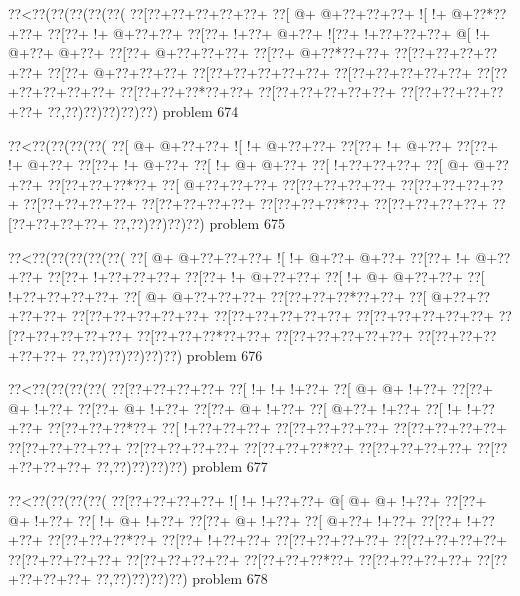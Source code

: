 \vbox{\vbox{\goo
\0??<\0??(\0??(\0??(\0??(\0??(
\0??[\0??+\0??+\0??+\0??+\0??+
\0??[\- @+\- @+\0??+\0??+\0??+
\- ![\- !+\- @+\0??*\0??+\0??+
\0??[\0??+\- !+\- @+\0??+\0??+
\0??[\0??+\- !+\0??+\- @+\0??+
\- ![\0??+\- !+\0??+\0??+\0??+
\- @[\- !+\- @+\0??+\- @+\0??+
\0??[\0??+\- @+\0??+\0??+\0??+
\0??[\0??+\- @+\0??*\0??+\0??+
\0??[\0??+\0??+\0??+\0??+\0??+
\0??[\0??+\- @+\0??+\0??+\0??+
\0??[\0??+\0??+\0??+\0??+\0??+
\0??[\0??+\0??+\0??+\0??+\0??+
\0??[\0??+\0??+\0??+\0??+\0??+
\0??[\0??+\0??+\0??*\0??+\0??+
\0??[\0??+\0??+\0??+\0??+\0??+
\0??[\0??+\0??+\0??+\0??+\0??+
\0??,\0??)\0??)\0??)\0??)\0??)
}
\hfil problem 674\hfil\break
}

\vbox{\vbox{\goo
\0??<\0??(\0??(\0??(\0??(
\0??[\- @+\- @+\0??+\0??+
\- ![\- !+\- @+\0??+\0??+
\0??[\0??+\- !+\- @+\0??+
\0??[\0??+\- !+\- @+\0??+
\0??[\0??+\- !+\- @+\0??+
\0??[\- !+\- @+\- @+\0??+
\0??[\- !+\0??+\0??+\0??+
\0??[\- @+\- @+\0??+\0??+
\0??[\0??+\0??+\0??*\0??+
\0??[\- @+\0??+\0??+\0??+
\0??[\0??+\0??+\0??+\0??+
\0??[\0??+\0??+\0??+\0??+
\0??[\0??+\0??+\0??+\0??+
\0??[\0??+\0??+\0??+\0??+
\0??[\0??+\0??+\0??*\0??+
\0??[\0??+\0??+\0??+\0??+
\0??[\0??+\0??+\0??+\0??+
\0??,\0??)\0??)\0??)\0??)
}
\hfil problem 675\hfil\break
}

\vbox{\vbox{\goo
\0??<\0??(\0??(\0??(\0??(\0??(
\0??[\- @+\- @+\0??+\0??+\0??+
\- ![\- !+\- @+\0??+\- @+\0??+
\0??[\0??+\- !+\- @+\0??+\0??+
\0??[\0??+\- !+\0??+\0??+\0??+
\0??[\0??+\- !+\- @+\0??+\0??+
\0??[\- !+\- @+\- @+\0??+\0??+
\0??[\- !+\0??+\0??+\0??+\0??+
\0??[\- @+\- @+\0??+\0??+\0??+
\0??[\0??+\0??+\0??*\0??+\0??+
\0??[\- @+\0??+\0??+\0??+\0??+
\0??[\0??+\0??+\0??+\0??+\0??+
\0??[\0??+\0??+\0??+\0??+\0??+
\0??[\0??+\0??+\0??+\0??+\0??+
\0??[\0??+\0??+\0??+\0??+\0??+
\0??[\0??+\0??+\0??*\0??+\0??+
\0??[\0??+\0??+\0??+\0??+\0??+
\0??[\0??+\0??+\0??+\0??+\0??+
\0??,\0??)\0??)\0??)\0??)\0??)
}
\hfil problem 676\hfil\break
}

\vbox{\vbox{\goo
\0??<\0??(\0??(\0??(\0??(
\0??[\0??+\0??+\0??+\0??+
\0??[\- !+\- !+\- !+\0??+
\0??[\- @+\- @+\- !+\0??+
\0??[\0??+\- @+\- !+\0??+
\0??[\0??+\- @+\- !+\0??+
\0??[\0??+\- @+\- !+\0??+
\0??[\- @+\0??+\- !+\0??+
\0??[\- !+\- !+\0??+\0??+
\0??[\0??+\0??+\0??*\0??+
\0??[\- !+\0??+\0??+\0??+
\0??[\0??+\0??+\0??+\0??+
\0??[\0??+\0??+\0??+\0??+
\0??[\0??+\0??+\0??+\0??+
\0??[\0??+\0??+\0??+\0??+
\0??[\0??+\0??+\0??*\0??+
\0??[\0??+\0??+\0??+\0??+
\0??[\0??+\0??+\0??+\0??+
\0??,\0??)\0??)\0??)\0??)
}
\hfil problem 677\hfil\break
}

\vbox{\vbox{\goo
\0??<\0??(\0??(\0??(\0??(
\0??[\0??+\0??+\0??+\0??+
\- ![\- !+\- !+\0??+\0??+
\- @[\- @+\- @+\- !+\0??+
\0??[\0??+\- @+\- !+\0??+
\0??[\- !+\- @+\- !+\0??+
\0??[\0??+\- @+\- !+\0??+
\0??[\- @+\0??+\- !+\0??+
\0??[\0??+\- !+\0??+\0??+
\0??[\0??+\0??+\0??*\0??+
\0??[\0??+\- !+\0??+\0??+
\0??[\0??+\0??+\0??+\0??+
\0??[\0??+\0??+\0??+\0??+
\0??[\0??+\0??+\0??+\0??+
\0??[\0??+\0??+\0??+\0??+
\0??[\0??+\0??+\0??*\0??+
\0??[\0??+\0??+\0??+\0??+
\0??[\0??+\0??+\0??+\0??+
\0??,\0??)\0??)\0??)\0??)
}
\hfil problem 678\hfil\break
}

